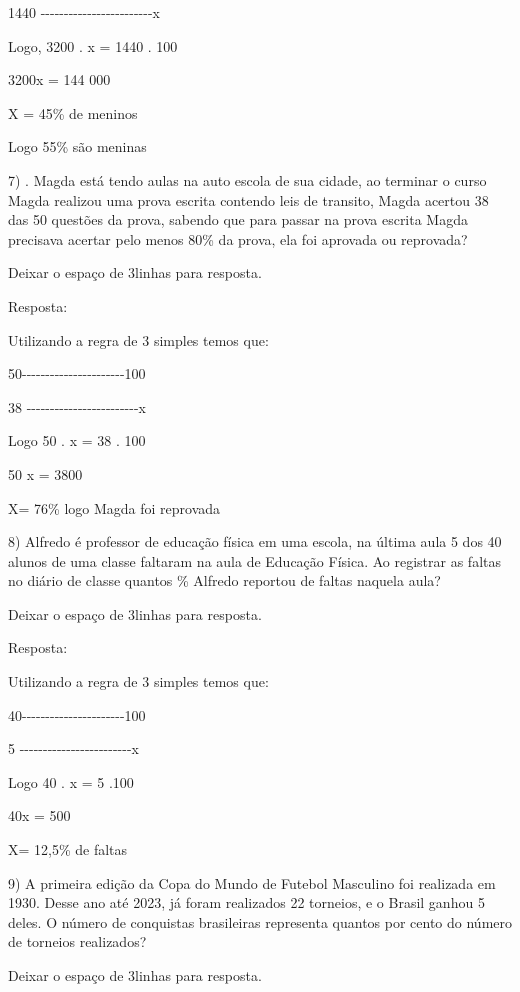 {1440
-\/-\/-\/-\/-\/-\/-\/-\/-\/-\/-\/-\/-\/-\/-\/-\/-\/-\/-\/-\/-\/-\/-\/-x

Logo, 3200 . x = 1440 . 100

3200x = 144 000

X = 45\% de meninos

Logo 55\% são meninas

7) . Magda está tendo aulas na auto escola de sua cidade, ao terminar o
curso Magda realizou uma prova escrita contendo leis de transito, Magda
acertou 38 das 50 questões da prova, sabendo que para passar na prova
escrita Magda precisava acertar pelo menos 80\% da prova, ela foi
aprovada ou reprovada?

Deixar o espaço de 3linhas para resposta.

Resposta:

Utilizando a regra de 3 simples temos que:

50-\/-\/-\/-\/-\/-\/-\/-\/-\/-\/-\/-\/-\/-\/-\/-\/-\/-\/-\/-\/-\/-100

38
-\/-\/-\/-\/-\/-\/-\/-\/-\/-\/-\/-\/-\/-\/-\/-\/-\/-\/-\/-\/-\/-\/-\/-x

Logo 50 . x = 38 . 100

50 x = 3800

X= 76\% logo Magda foi reprovada

8) Alfredo é professor de educação física em uma escola, na última aula
5 dos 40 alunos de uma classe faltaram na aula de Educação Física. Ao
registrar as faltas no diário de classe quantos \% Alfredo reportou de
faltas naquela aula?

Deixar o espaço de 3linhas para resposta.

Resposta:

Utilizando a regra de 3 simples temos que:

40-\/-\/-\/-\/-\/-\/-\/-\/-\/-\/-\/-\/-\/-\/-\/-\/-\/-\/-\/-\/-\/-100

5
-\/-\/-\/-\/-\/-\/-\/-\/-\/-\/-\/-\/-\/-\/-\/-\/-\/-\/-\/-\/-\/-\/-\/-x

Logo 40 . x = 5 .100

40x = 500

X= 12,5\% de faltas

9) A primeira edição da Copa do Mundo de Futebol Masculino foi realizada
em 1930. Desse ano até 2023, já foram realizados 22 torneios, e o Brasil
ganhou 5 deles. O número de conquistas brasileiras representa quantos
por cento do número de torneios realizados?

Deixar o espaço de 3linhas para resposta.

}
